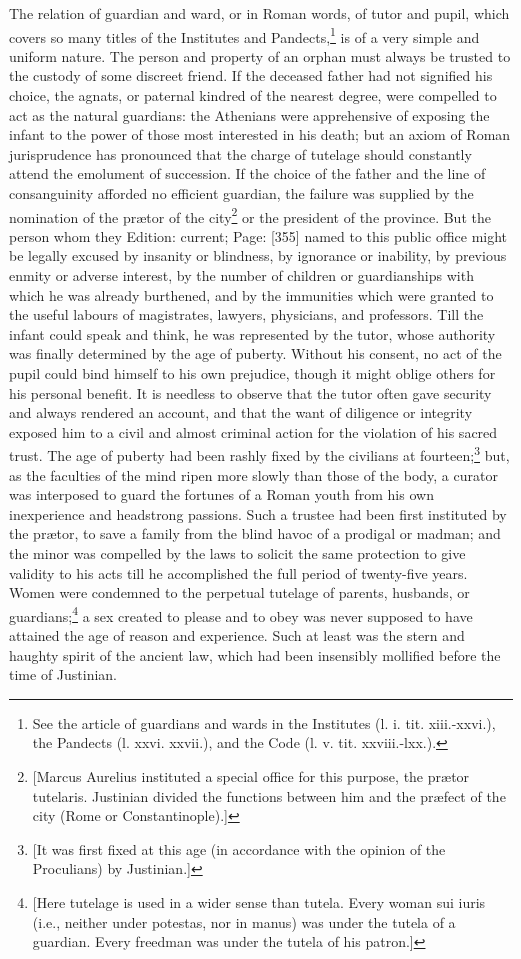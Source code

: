 The relation of guardian and ward, or in Roman words, of tutor and pupil, which covers so many titles of the Institutes and Pandects,\footnote{See the article of guardians and wards in the Institutes (l. i. tit. xiii.-xxvi.), the Pandects (l. xxvi. xxvii.), and the Code (l. v. tit. xxviii.-lxx.).} is of a very simple and uniform nature. The person and property of an orphan must always be trusted to the custody of some discreet friend. If the deceased father had not signified his choice, the agnats, or paternal kindred of the nearest degree, were compelled to act as the natural guardians: the Athenians were apprehensive of exposing the infant to the power of those most interested in his death; but an axiom of Roman jurisprudence has pronounced that the charge of tutelage should constantly attend the emolument of succession. If the choice of the father and the line of consanguinity afforded no efficient guardian, the failure was supplied by the nomination of the prætor of the city\footnote{[Marcus Aurelius instituted a special office for this purpose, the prætor tutelaris. Justinian divided the functions between him and the præfect of the city (Rome or Constantinople).]} or the president of the province. But the person whom they Edition: current; Page: [355] named to this public office might be legally excused by insanity or blindness, by ignorance or inability, by previous enmity or adverse interest, by the number of children or guardianships with which he was already burthened, and by the immunities which were granted to the useful labours of magistrates, lawyers, physicians, and professors. Till the infant could speak and think, he was represented by the tutor, whose authority was finally determined by the age of puberty. Without his consent, no act of the pupil could bind himself to his own prejudice, though it might oblige others for his personal benefit. It is needless to observe that the tutor often gave security and always rendered an account, and that the want of diligence or integrity exposed him to a civil and almost criminal action for the violation of his sacred trust. The age of puberty had been rashly fixed by the civilians at fourteen;\footnote{[It was first fixed at this age (in accordance with the opinion of the Proculians) by Justinian.]} but, as the faculties of the mind ripen more slowly than those of the body, a curator was interposed to guard the fortunes of a Roman youth from his own inexperience and headstrong passions. Such a trustee had been first instituted by the prætor, to save a family from the blind havoc of a prodigal or madman; and the minor was compelled by the laws to solicit the same protection to give validity to his acts till he accomplished the full period of twenty-five years. Women were condemned to the perpetual tutelage of parents, husbands, or guardians;\footnote{[Here tutelage is used in a wider sense than tutela. Every woman sui iuris (i.e., neither under potestas, nor in manus) was under the tutela of a guardian. Every freedman was under the tutela of his patron.]} a sex created to please and to obey was never supposed to have attained the age of reason and experience. Such at least was the stern and haughty spirit of the ancient law, which had been insensibly mollified before the time of Justinian.

